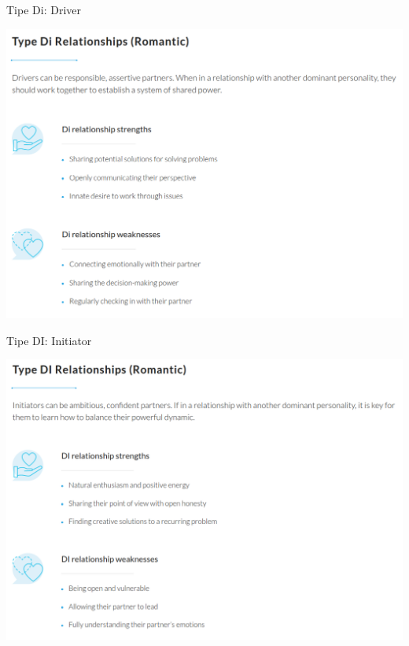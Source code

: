 \documentclass{beamer}
\theoremstyle{mystyle}
\begin{document}
\begin{frame}{Tipe Di: Driver}
	\begin{center}
		\includegraphics[scale=.275]{images/di}
	\end{center}
\end{frame}

\begin{frame}{Tipe DI: Initiator}
	\begin{center}
		\includegraphics[scale=.275]{images/DI}
	\end{center}
\end{frame}
\end{document}
